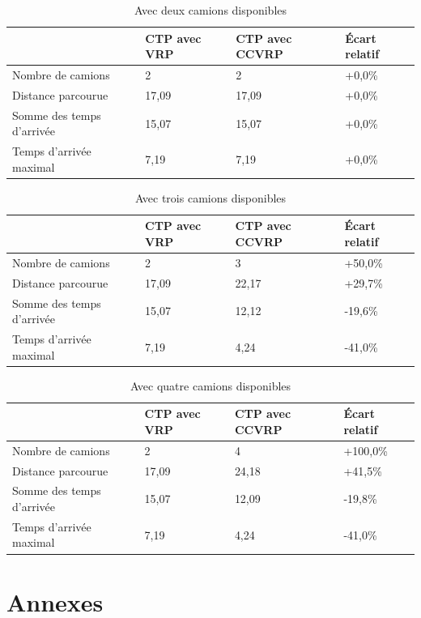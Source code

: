 \documentclass[12pt, a4paper, onecolumn, twoside,french,cleardoublepage=plain,openany]{article}
\begin{document}
\begin{table}[h] \centering
\begin{tabular}{@{}llll@{}}
\toprule %
 & CTP avec VRP & CTP avec CCVRP & Écart relatif \\ \midrule
Nombre de camions & 2 & 2 & +0,0\% \\
Distance parcourue & 17,09 & 17,09 & +0,0\% \\
Somme des temps d'arrivée & 15,07 & 15,07 & +0,0\% \\
Temps d'arrivée maximal & 7,19 & 7,19 & +0,0\% \\ \bottomrule
\end{tabular}
\caption{Avec deux camions disponibles}
\label{deux_camions}
\end{table}

\begin{table}[h] \centering
\begin{tabular}{@{}llll@{}}
\toprule %
 & CTP avec VRP & CTP avec CCVRP & Écart relatif \\ \midrule
Nombre de camions & 2 & 3 & +50,0\% \\
Distance parcourue & 17,09 & 22,17 & +29,7\% \\
Somme des temps d'arrivée & 15,07 & 12,12 & -19,6\% \\
Temps d'arrivée maximal & 7,19 & 4,24 & -41,0\% \\ \bottomrule
\end{tabular}
\caption{Avec trois camions disponibles}
\label{trois_camions}
\end{table}

\begin{table}[h] \centering
\begin{tabular}{@{}llll@{}}
\toprule %
 & CTP avec VRP & CTP avec CCVRP & Écart relatif \\ \midrule
Nombre de camions & 2 & 4 & +100,0\% \\
Distance parcourue & 17,09 & 24,18 & +41,5\% \\
Somme des temps d'arrivée & 15,07 & 12,09 & -19,8\% \\
Temps d'arrivée maximal & 7,19 & 4,24 & -41,0\% \\ \bottomrule
\end{tabular}
\caption{Avec quatre camions disponibles}
\label{quatre_camions}
\end{table}

\section*{Annexes}
\end{document}
